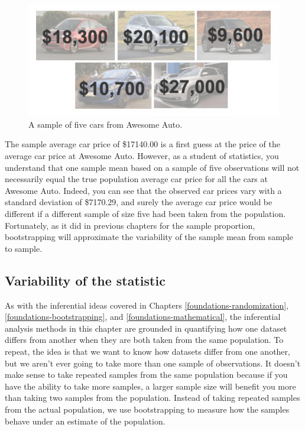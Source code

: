 \documentclass[
  10pt,
  openany]{book}
\begin{document}
\begin{figure}[h]

{\centering \includegraphics[width=0.75\linewidth]{images/5cars} 

}

\caption{A sample of five cars from Awesome Auto.}\label{fig:5cars}
\end{figure}

The sample average car price of \$17140.00 is a first guess at the price of the average car price at Awesome Auto.
However, as a student of statistics, you understand that one sample mean based on a sample of five observations will not necessarily equal the true population average car price for all the cars at Awesome Auto.
Indeed, you can see that the observed car prices vary with a standard deviation of \$7170.29, and surely the average car price would be different if a different sample of size five had been taken from the population.
Fortunately, as it did in previous chapters for the sample proportion, bootstrapping will approximate the variability of the sample mean from sample to sample.

\hypertarget{variability-of-the-statistic-9}{%
\subsection{Variability of the statistic}\label{variability-of-the-statistic-9}}

As with the inferential ideas covered in Chapters \ref{foundations-randomization}, \ref{foundations-bootstrapping}, and \ref{foundations-mathematical}, the inferential analysis methods in this chapter are grounded in quantifying how one dataset differs from another when they are both taken from the same population.
To repeat, the idea is that we want to know how datasets differ from one another, but we aren't ever going to take more than one sample of observations.
It doesn't make sense to take repeated samples from the same population because if you have the ability to take more samples, a larger sample size will benefit you more than taking two samples from the population.
Instead of taking repeated samples from the actual population, we use bootstrapping to measure how the samples behave under an estimate of the population.
\end{document}
